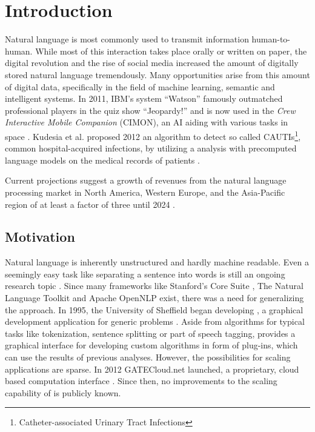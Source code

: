 
\chapter{Introduction}


Natural language is most commonly used to transmit information human-to-human. While most of this interaction takes place orally or written on paper, the digital revolution and the rise of social media increased the amount of digitally stored natural language tremendously. Many opportunities arise from this amount of digital data, specifically in the field of machine learning, semantic and intelligent systems. In 2011, IBM's \qa{} system ``Watson'' famously outmatched professional players in the quiz show ``Jeopardy!'' \cite{ferrucci2012introduction,epstein2012making} and is now used in the \emph{Crew Interactive Mobile Companion} (CIMON), an AI aiding with various tasks in space \cite{cimon}. Kudesia et al. proposed 2012 an algorithm to detect so called CAUTIs\footnote{Catheter-associated Urinary Tract Infections}, common hospital-acquired infections, by utilizing a \nlp{} analysis with precomputed language models on the medical records of patients \cite{kudesia2012natural}.

Current projections suggest a growth of revenues from the natural language processing market in North America, Western Europe, and the Asia-Pacific region of at least a factor of three until 2024 \cite{stat:nlpeurope,stat:nlpamerica,stat:nlpasia}.

\section{Motivation}

Natural language is inherently unstructured and hardly machine readable. Even a seemingly easy task like separating a sentence into words is still an ongoing research topic \cite{pak2018text}. Since many \nlp{} frameworks like Stanford's Core \nlp Suite \cite{manning-EtAl:2014:P14-5}, The Natural Language Toolkit \cite{bird2004nltk} and Apache OpenNLP \cite{opennlp} exist, there was a need for generalizing the \nlp{} approach. In 1995, the University of Sheffield began developing \nlpGate{}, a graphical development application for generic \nlp{} problems \cite{cunningham2002gate}. Aside from algorithms for typical \nlp{} tasks like tokenization, sentence splitting or part of speech tagging, \nlpGate{} provides a graphical interface for developing custom algorithms in form of plug-ins, which can use the results of previous \nlp{} analyses. However, the possibilities for scaling \nlpGate{} applications are sparse. In 2012 GATECloud.net launched, a proprietary, cloud based \nlpGate{} computation interface \cite{tablan2013gatecloud}. Since then, no improvements to the scaling capability of \nlpGate{} is publicly known. 

